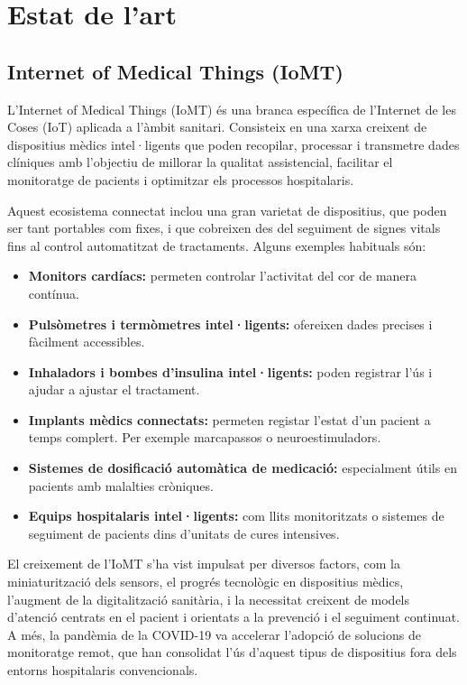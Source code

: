 
\chapter[Estat de l'art]{Estat de l'art}
  
  \section{Internet of Medical Things (IoMT)} 
  L’Internet of Medical Things (IoMT) és una branca específica de l’Internet de les Coses (IoT) aplicada a l’àmbit sanitari. Consisteix en una xarxa creixent de dispositius mèdics intel·ligents que poden recopilar, processar i transmetre dades clíniques amb l’objectiu de millorar la qualitat assistencial, facilitar el monitoratge de pacients i optimitzar els processos hospitalaris.

  Aquest ecosistema connectat inclou una gran varietat de dispositius, que poden ser tant portables com fixes, i que cobreixen des del seguiment de signes vitals fins al control automatitzat de tractaments. Alguns exemples habituals són:

  \begin{itemize}
    \item \textbf{Monitors cardíacs:} permeten controlar l’activitat del cor de manera contínua.
    \item \textbf{Pulsòmetres i termòmetres intel·ligents:} ofereixen dades precises i fàcilment accessibles.
    \item \textbf{Inhaladors i bombes d’insulina intel·ligents:} poden registrar l’ús i ajudar a ajustar el tractament.
    \item \textbf{Implants mèdics connectats: } permeten registar l'estat d'un pacient a temps complert. Per exemple marcapassos o neuroestimuladors.
    \item \textbf{Sistemes de dosificació automàtica de medicació:} especialment útils en pacients amb malalties cròniques.
    \item \textbf{Equips hospitalaris intel·ligents:} com llits monitoritzats o sistemes de seguiment de pacients dins d’unitats de cures intensives.
  \end{itemize}

  El creixement de l’IoMT s’ha vist impulsat per diversos factors, com la miniaturització dels sensors, el progrés tecnològic en dispositius mèdics, l’augment de la digitalització sanitària, i la necessitat creixent de models d’atenció centrats en el pacient i orientats a la prevenció i el seguiment continuat. A més, la pandèmia de la COVID-19 va accelerar l’adopció de solucions de monitoratge remot, que han consolidat l’ús d’aquest tipus de dispositius fora dels entorns hospitalaris convencionals.

